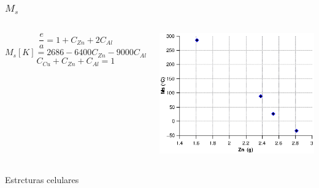 \documentclass[usenames,dvipsnames]{beamer}
\begin{document}

\begin{frame}

\frametitle{$M_s$}

\begin{columns}
 \begin{equation*}
\frac{e}{a} = 1+C_{Zn}+2C_{Al}
\end{equation*}
\begin{equation*}
M_s[K]=2686-6400C_{Zn}-9000C_{Al} \label{Ms} 
\end{equation*}
\begin{equation*}
     C_{Cu}+C_{Zn}+C_{Al}=1
\end{equation*}


\includegraphics[width=\columnwidth]{img/intro/MsZn2.eps}

\end{columns}

\end{frame}

\begin{frame}
 
 Estrcturas celulares
 
\end{frame}
\end{document}
